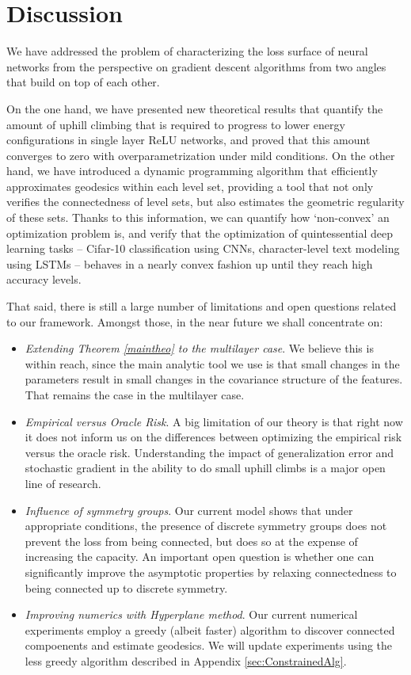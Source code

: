 \section{Discussion}
\label{sec:Discussion}

We have addressed the problem of characterizing the loss surface of neural networks from the perspective
on gradient descent algorithms from two angles that build on top of each other. 

On the one hand, we have presented new theoretical results that quantify 
the amount of uphill climbing that is required to progress to lower energy configurations in 
single layer ReLU networks, and proved that this amount converges to zero with overparametrization under mild conditions. On the other hand, we have introduced a dynamic programming algorithm that efficiently approximates geodesics within each level set, providing a tool that not only verifies the connectedness of level sets, but also estimates the geometric regularity of these sets. Thanks to this information, we can quantify how `non-convex' an optimization problem is, and verify that the optimization of quintessential deep learning tasks -- Cifar-10 classification using CNNs, character-level text modeling using LSTMs -- behaves in a nearly convex fashion up until they reach high accuracy levels.

That said, there is still a large number of limitations and open questions related to our framework. Amongst those, in the near future we shall concentrate on:
\begin{itemize}
\item \emph{Extending Theorem \ref{maintheo} to the multilayer case}. We believe this is within reach, since the main analytic tool we use is that small changes in the parameters result in small changes in the covariance structure of the features. That remains the case in the multilayer case. 
\item \emph{Empirical versus Oracle Risk}. A big limitation of our theory is that right now it does not inform us on the differences between optimizing the empirical risk versus the oracle risk. Understanding the impact of generalization error and stochastic gradient in the ability to do small uphill climbs is a major open line of research.
\item \emph{Influence of symmetry groups}. Our current model shows that under appropriate conditions, the presence of discrete symmetry groups does not prevent the loss from being connected, but does so at the expense of increasing the capacity. An important open question is whether one can significantly improve the asymptotic properties by relaxing connectedness to being connected up to discrete symmetry. 
\item \emph{Improving numerics with Hyperplane method}. Our current numerical experiments employ a greedy (albeit faster) algorithm to discover connected compoenents and estimate geodesics. We will update experiments using the less greedy algorithm described in Appendix \ref{sec:ConstrainedAlg}. 
\end{itemize}
 

%
